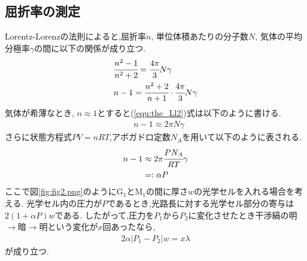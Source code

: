 \subsection{屈折率の測定}
Lorentz-Lorenzの法則によると,屈折率$n$, 単位体積あたりの分子数$N$, 気体の平均分極率$\gamma$の間に以下の関係が成り立つ.
\begin{align}
  \label{equ:the_LL1}
  &\cfrac{n^2-1}{n^2+2}=\cfrac{4\pi}{3}N\gamma\\
  \label{equ:the_Ll2}
  &n-1=\cfrac{n^2+2}{n+1}\cdot\cfrac{4\pi}{3}N\gamma
\end{align}
気体が希薄なとき, $n\approx1$とすると(\ref{equ:the_Ll2})式は以下のように書ける.
\begin{align}
  \label{equ:the_LL_approx}
  &n-1\approx2\pi N\gamma
\end{align}
さらに状態方程式$PV=nRT$,アボガドロ定数$N_A$を用いて以下のように表される.
\begin{align}
  \label{equ:the_LL_state}
  \begin{split}
  n-1&\approx2\pi \cfrac{PN_A}{RT}\gamma\\&=:\alpha P
  \end{split}
\end{align}
ここで図\ref{fig:fig2.png}のように$\mathrm{G_1}$と$\mathrm{M_1}$の間に厚さ$w$の光学セルを入れる場合を考える.
光学セル内の圧力が$P$であるとき,光路長に対する光学セル部分の寄与は$2(1+\alpha P)w$である.
したがって,圧力を$P_1$から$P_2$に変化させたとき干渉縞の明$\rightarrow$暗$\rightarrow$明という変化が$x$回あったなら,
\begin{align}
  \label{equ:the_alpha}
  2\alpha|P_1-P_2|w=x\lambda
\end{align}
が成り立つ.
